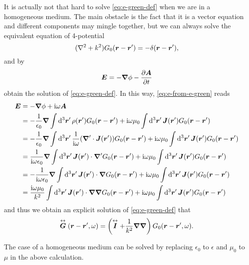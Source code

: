 \documentclass[hyperref, a4paper]{article}
\newcommand*{\ii}{\mathrm{i}}
\renewcommand{\tensor}[1]{ \stackrel{\leftrightarrow}{\vb*{#1}}}
\begin{document}
It is actually not that hard to solve \eqref{eq:e-green-def} when we are in a homogeneous medium.
The main obstacle is the fact that it is a vector equation and different components may mingle together, but we can always solve the equivalent equation of 4-potential 
\begin{equation}
    (\laplacian + k^2) G_0(\vb*{r} - \vb*{r}') =- \delta(\vb*{r}- \vb*{r}'),
    \label{eq:potential-green}
\end{equation}
and by 
\[
    \vb*{E} = - \grad{\phi} - \pdv{\vb*{A}}{t}
\]
obtain the solution of \eqref{eq:e-green-def}.
In this way, \eqref{eq:e-from-e-green} reads 
\[
    \begin{aligned}
        \vb*{E} &= - \grad{\phi} + \ii \omega \vb*{A} \\
        &= - \frac{1}{\epsilon_0} \grad \int \dd[3]{\vb*{r}'} \rho(\vb*{r}') G_0(\vb*{r} - \vb*{r}') + \ii \omega \mu_0 \int \dd[3]{\vb*{r}'} \vb*{J}(\vb*{r}') G_0(\vb*{r} - \vb*{r}') \\
        &= - \frac{1}{\epsilon_0} \grad \int \dd[3]{\vb*{r}'} \frac{1}{\ii \omega} (\grad' \cdot {\vb*{J}(\vb*{r}')}) G_0(\vb*{r} - \vb*{r}') + \ii \omega \mu_0 \int \dd[3]{\vb*{r}'} \vb*{J}(\vb*{r}') G_0(\vb*{r} - \vb*{r}') \\
        &= \frac{1}{\ii \omega \epsilon_0} \grad \int \dd[3]{\vb*{r}'} \vb*{J}(\vb*{r}') \cdot \grad' G_0(\vb*{r} - \vb*{r}') + \ii \omega \mu_0 \int \dd[3]{\vb*{r}'} \vb*{J}(\vb*{r}') G_0(\vb*{r} - \vb*{r}') \\
        &= - \frac{1}{\ii \omega \epsilon_0} \grad \int \dd[3]{\vb*{r}'} \vb*{J}(\vb*{r}') \cdot \grad G_0(\vb*{r} - \vb*{r}') + \ii \omega \mu_0 \int \dd[3]{\vb*{r}'} \vb*{J}(\vb*{r}') G_0(\vb*{r} - \vb*{r}') \\
        &= \frac{\ii \omega \mu_0}{k^2} \int \dd[3]{\vb*{r}'} \vb*{J}(\vb*{r}') \cdot \grad \grad G_0(\vb*{r} - \vb*{r}') + \ii \omega \mu_0 \int \dd[3]{\vb*{r}'} \vb*{J}(\vb*{r}') G_0(\vb*{r} - \vb*{r}')
    \end{aligned}
\]
and thus we obtain an explicit solution of \eqref{eq:e-green-def} that 
\begin{equation}
    \tensor{G}(\vb*{r} - \vb*{r}', \omega) = \left( \tensor{I} + \frac{1}{k^2} \grad \grad \right) G_0(\vb*{r} - \vb*{r}', \omega).
    \label{eq:free-space-e-green}
\end{equation}

The case of a homogeneous medium can be solved by replacing $\epsilon_0$ to $\epsilon$ and $\mu_0$ to $\mu$ in the above calculation.
\end{document}
